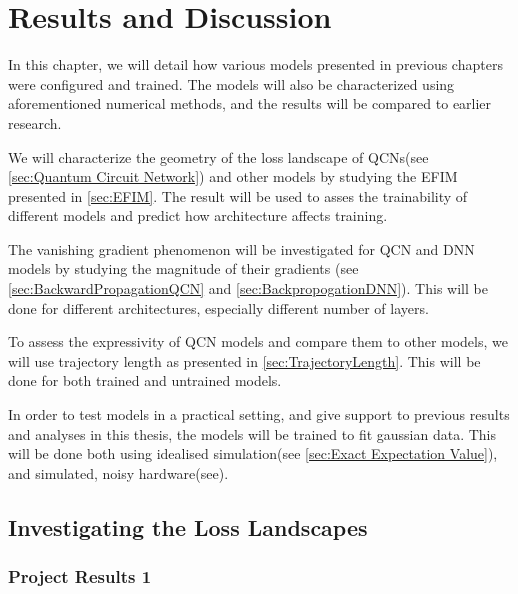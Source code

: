 \chapter{Results and Discussion}\label{chap:results_discussion}
In this chapter, we will detail how various models presented in previous chapters were configured and trained. The models will also be characterized using aforementioned numerical methods, and the results will be compared to earlier research.

We will characterize the geometry of the loss landscape of QCNs(see \autoref{sec:Quantum Circuit Network}) and other models by studying the EFIM presented in \autoref{sec:EFIM}. The result will be used to asses the trainability of different models and predict how architecture affects training.

The vanishing gradient phenomenon will be investigated for QCN and DNN models by studying the magnitude of their gradients (see \autoref{sec:BackwardPropagationQCN} and \autoref{sec:BackpropogationDNN}). This will be done for different architectures, especially different number of layers.

To assess the expressivity of QCN models and compare them to other models, we will use trajectory length as presented in \autoref{sec:TrajectoryLength}. This will be done for both trained and untrained models.

In order to test models in a practical setting, and give support to previous results and analyses in this thesis, the models will be trained to fit gaussian data. This will be done both using idealised simulation(see \autoref{sec:Exact Expectation Value}), and simulated, noisy hardware(see).

\section{Investigating the Loss Landscapes}\label{sec:Investigating the Loss Landscapes}



\subsection{Project Results 1}\label{sec:project results}


